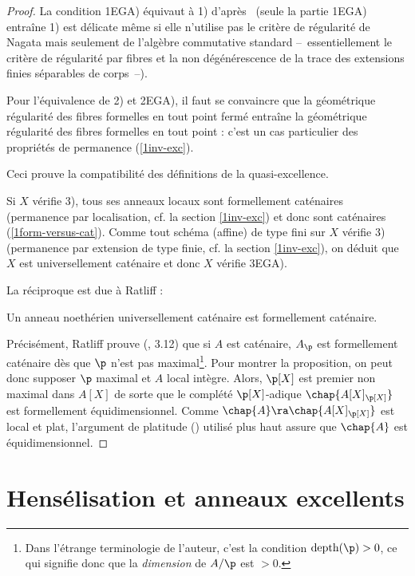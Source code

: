 \documentclass[10pt]{../fichiers-configuration-latex/smfart}
\begin{document}
\begin{proof}

La condition 1EGA) équivaut à 1) d'après~ (seule la partie 1EGA) entraîne 1) est
délicate même si elle n'utilise pas le critère de régularité de Nagata mais seulement de l'algèbre
commutative standard -- essentiellement le critère de régularité par fibres et la non dégénérescence
de la trace des extensions finies séparables de corps --).

Pour l'équivalence de 2) et 2EGA), il faut se convaincre que la géométrique régularité des fibres
formelles en tout point fermé entraîne la géométrique régularité des fibres formelles en tout point
: c'est un cas particulier des propriétés de permanence (\ref{1inv-exc}).


Ceci prouve la compatibilité des définitions de la quasi-excellence.

Si $X$ vérifie 3), tous ses anneaux locaux sont formellement caténaires (permanence par
localisation, cf. la section \ref{1inv-exc}) et donc sont caténaires (\ref{1form-versus-cat}).
Comme tout schéma (affine) de type fini sur $X$ vérifie 3) (permanence par extension de type finie,
cf. la section \ref{1inv-exc}), on déduit que $X$ est universellement caténaire et donc $X$ vérifie
3EGA).


La réciproque est due à Ratliff :

\begin{proposition2}[Ratliff]\label{1Ratliff}\label{1form-cat->uni-cat} Un anneau noethérien
universellement caténaire est formellement caténaire.\end{proposition2}

Précisément, Ratliff prouve (\cite{Rat71}, 3.12) que si $A$ est caténaire, $A_\p$ est formellement
caténaire dès que $\p$ n'est pas maximal\footnote{Dans l'étrange terminologie de l'auteur, c'est la
condition $\text{depth}(\p)>0$, ce qui signifie donc que la \emph{dimension} de $A/\p$ est $>0$.}.
Pour montrer la proposition, on peut donc supposer $\p$ maximal et $A$ local intègre. Alors, $\p[X]$
est premier non maximal dans $A[X]$ de sorte que le complété $\p[X]$-adique $\chap{A[X]_{\p[X]}}$
est formellement équidimensionnel. Comme $\chap{A}\ra\chap{A[X]_{\p[X]}}$ est local et plat,
l'argument de platitude () utilisé plus haut assure que $\chap{A}$ est
équidimensionnel.

\end{proof}


\section{Hensélisation et anneaux excellents}
\label{1-henselisation-anneaux-excellents}
\end{document}
